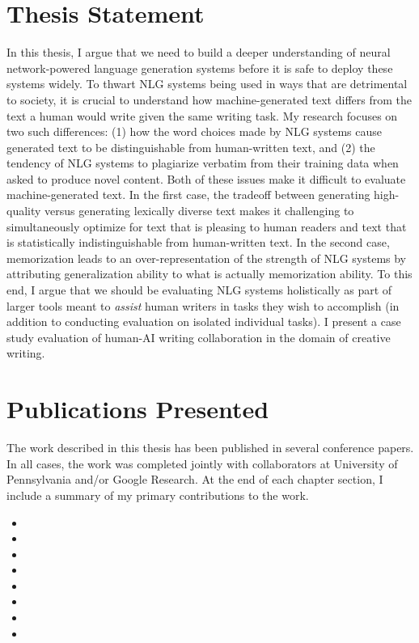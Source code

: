 \section{Thesis Statement}
In this thesis, I argue that we need to build a deeper understanding of neural network-powered language generation systems before it is safe to deploy these systems widely.
To thwart NLG systems being used in ways that are detrimental to society, it is crucial to understand how machine-generated text differs from the text a human would write given the same writing task.
My research focuses on two such differences: (1) how the word choices made by NLG systems cause generated text to be distinguishable from human-written text, and (2) the tendency of NLG systems to plagiarize verbatim from their training data when asked to produce novel content.
Both of these issues make it difficult to evaluate machine-generated text.
In the first case, the tradeoff between generating high-quality versus generating lexically diverse text makes it challenging to simultaneously optimize for text that is pleasing to human readers and text that is statistically indistinguishable from human-written text.
In the second case, memorization leads to an over-representation of the strength of NLG systems by attributing generalization ability to what is actually memorization ability.
To this end, I argue that we should be evaluating NLG systems holistically as part of larger tools meant to \textit{assist} human writers in tasks they wish to accomplish (in addition to conducting evaluation on isolated individual tasks).
I present a case study evaluation of human-AI writing collaboration in the domain of creative writing.

\section{Publications Presented}
The work described in this thesis has been published in several conference papers. In all cases, the work was completed jointly with collaborators at University of Pennsylvania and/or Google Research.
At the end of each chapter section, I include a summary of my primary contributions to the work.

\begin{itemize}
  \item {}
  \item {}
  \item {}
  \item {}
  \item {}
  \item {}
  \item {}
  \item {}
\end{itemize}


